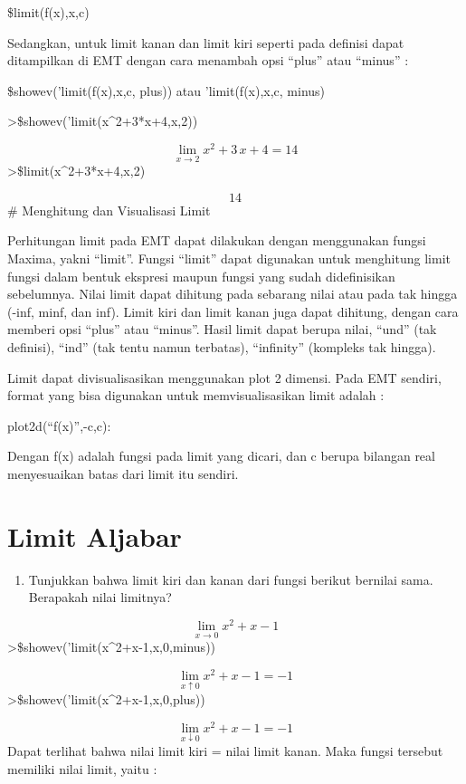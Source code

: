 \documentclass[
]{book}
\providecommand{\tightlist}{%
  \setlength{\itemsep}{0pt}\setlength{\parskip}{0pt}}
\begin{document}
\$limit(f(x),x,c)

Sedangkan, untuk limit kanan dan limit kiri seperti pada definisi dapat ditampilkan di EMT dengan cara menambah opsi ``plus'' atau ``minus'' :

\$showev('limit(f(x),x,c, plus)) atau 'limit(f(x),x,c, minus)

\textgreater\$showev('limit(x\^{}2+3*x+4,x,2))

\[\lim_{x\rightarrow 2}{x^2+3\,x+4}=14\]\textgreater\$limit(x\^{}2+3*x+4,x,2)

\[14\]\# Menghitung dan Visualisasi Limit

Perhitungan limit pada EMT dapat dilakukan dengan menggunakan fungsi Maxima, yakni ``limit''. Fungsi ``limit'' dapat digunakan untuk menghitung limit fungsi dalam bentuk ekspresi maupun fungsi yang sudah didefinisikan sebelumnya. Nilai limit dapat dihitung pada sebarang nilai atau pada tak hingga (-inf, minf, dan inf). Limit kiri dan limit kanan juga dapat dihitung, dengan cara memberi opsi ``plus'' atau ``minus''. Hasil limit dapat berupa nilai, ``und'' (tak definisi), ``ind'' (tak tentu namun terbatas), ``infinity'' (kompleks tak hingga).

Limit dapat divisualisasikan menggunakan plot 2 dimensi. Pada EMT sendiri, format yang bisa digunakan untuk memvisualisasikan limit adalah :

plot2d(``f(x)'',-c,c):

Dengan f(x) adalah fungsi pada limit yang dicari, dan c berupa bilangan real menyesuaikan batas dari limit itu sendiri.

\section{Limit Aljabar}\label{limit-aljabar}

\begin{enumerate}
\def\labelenumi{\arabic{enumi}.}
\tightlist
\item
  Tunjukkan bahwa limit kiri dan kanan dari fungsi berikut bernilai sama. Berapakah nilai limitnya?
\end{enumerate}

\[\lim_{x\rightarrow 0}{x^2+x-1}\]\textgreater\$showev('limit(x\^{}2+x-1,x,0,minus))

\[\lim_{x\uparrow 0}{x^2+x-1}=-1\]\textgreater\$showev('limit(x\^{}2+x-1,x,0,plus))

\[\lim_{x\downarrow 0}{x^2+x-1}=-1\]Dapat terlihat bahwa nilai limit kiri = nilai limit kanan. Maka fungsi tersebut memiliki nilai limit, yaitu :
\end{document}
